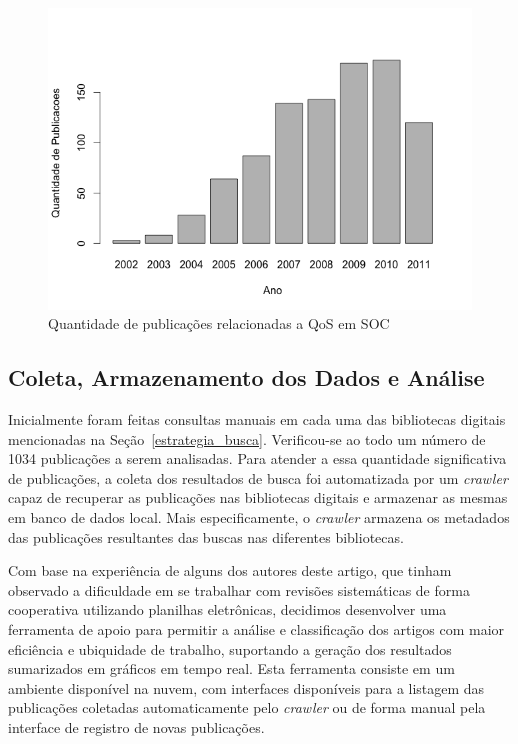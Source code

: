 \begin{figure}[htb]
\centering
\includegraphics[scale=0.5]{imagens/barplotAnoQuantidadePublicacoes.pdf}
\caption{Quantidade de publica\c c\~{o}es relacionadas a QoS em SOC}
\label{fig:barplotAnoPublicacoes}
\end{figure}

\subsection{Coleta, Armazenamento dos Dados e Análise}

Inicialmente foram feitas consultas manuais em cada uma das bibliotecas digitais mencionadas na Se\c c\~{a}o~\ref{estrategia_busca}. Verificou-se ao todo um número de 1034 publicações a serem analisadas. Para atender a essa quantidade significativa de publica\c c\~{o}es, a coleta dos resultados de busca foi automatizada por um \emph{crawler} capaz de recuperar as publica\c c\~{o}es nas bibliotecas digitais e armazenar as mesmas em banco de dados local. Mais especificamente, o \emph{crawler} armazena os metadados das publicações resultantes das buscas nas diferentes bibliotecas.


Com base na experi\^{e}ncia de alguns dos autores deste artigo, que tinham observado a dificuldade em se trabalhar com revis\~{o}es sistem\'{a}ticas de forma cooperativa utilizando planilhas eletr\^{o}nicas, decidimos desenvolver uma ferramenta de apoio para permitir a an\'{a}lise e 
classifica\c c\~{a}o dos artigos com maior eficiência e ubiquidade de trabalho, suportando a gera\c c\~{a}o dos resultados sumarizados em gr\'{a}ficos em tempo real. Esta ferramenta consiste em um ambiente disponível na nuvem, com interfaces disponíveis para a listagem das publicações coletadas automaticamente pelo \emph{crawler} ou de forma manual pela interface de registro de novas publicações.

